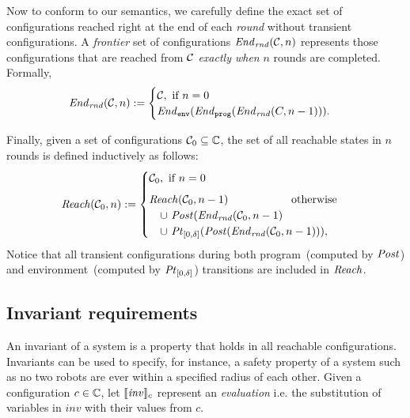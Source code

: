 Now to conform to our semantics, we carefully define the exact set of configurations
reached right at the end of each \emph{round} without transient configurations.
A \emph{frontier} set of configurations $\mathit{End}_\mathit{rnd}(\mathcal{C}, n)$ represents those configurations
that are reached from $\mathcal{C}$ \emph{exactly when} $n$ rounds are completed.
Formally,
\[
\mathit{End}_\mathit{rnd}(\mathcal{C},n) :=
    \begin{cases}
        \mathcal{C}, \text{ if } n = 0\\
        \mathit{End}_{\mathtt{env}}(\mathit{End}_{\mathtt{prog}}(\mathit{End}_\mathit{rnd}(C,n-1))).
    \end{cases}
\]


Finally, given a set of configurations $\mathcal{C}_0\subseteq\mathbb{C}$,
the set of all reachable states in $n$ rounds is defined inductively as follows:
\[
\mathit{Reach}(\mathcal{C}_0, n) :=
    \begin{cases}
        \mathcal{C}_0, \text{ if } n = 0 \\[5pt]
        \mathit{Reach}(\mathcal{C}_0,n-1) \text{\hspace{2cm}otherwise} \\
        \quad \cup\ \mathit{Post}(\mathit{End}_\mathit{rnd}(\mathcal{C}_0,n-1) \\ 
        \quad \cup\ \mathit{Pt}_{[0,\delta]}(\mathit{Post}(\mathit{End}_\mathit{rnd}(\mathcal{C}_0,n-1))),\\
    \end{cases}
\]
Notice that all transient configurations during both program~(computed by $\mathit{Post}$) and environment~(computed by $\mathit{Pt}_{[0,\delta]}$) transitions are included in $\mathit{Reach}$.


\subsection{Invariant requirements}
An invariant of a system is a property that holds in all reachable configurations. Invariants can be used to specify, for instance, a safety property of a system such as no two robots are ever within a specified radius of each other. 
Given a configuration $c \in \mathbb{C}$, let $\llbracket\mathit{inv}\rrbracket_{c}$ represent an \emph{evaluation} i.e. the substitution of variables in $\mathit{inv}$ with their values from $c$.

